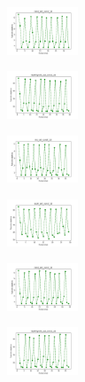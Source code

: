 \begin{figure}[H]
\begin{subfigure}
        \centering
        \includegraphics[width=0.234\textwidth]{img/ils-es/rand_set_const_10_277451237_cost.png}
    \end{subfigure}
    \hfill
    \begin{subfigure}
        \centering
        \includegraphics[width=0.234\textwidth]{img/ils-es/newthyroid_set_const_10_277451237_cost.png}
    \end{subfigure}
    \hfill
    \begin{subfigure}
        \centering
        \includegraphics[width=0.234\textwidth]{img/ils-es/iris_set_const_10_49258669_cost.png}
    \end{subfigure}
    \hfill
    \begin{subfigure}
        \centering
        \includegraphics[width=0.234\textwidth]{img/ils-es/ecoli_set_const_10_49258669_cost.png}
    \end{subfigure}
    \hfill
    \begin{subfigure}
        \centering
        \includegraphics[width=0.234\textwidth]{img/ils-es/rand_set_const_10_49258669_cost.png}
    \end{subfigure}
    \hfill
    \begin{subfigure}
        \centering
        \includegraphics[width=0.234\textwidth]{img/ils-es/newthyroid_set_const_10_49258669_cost.png}

\end{subfigure}
\end{figure}
